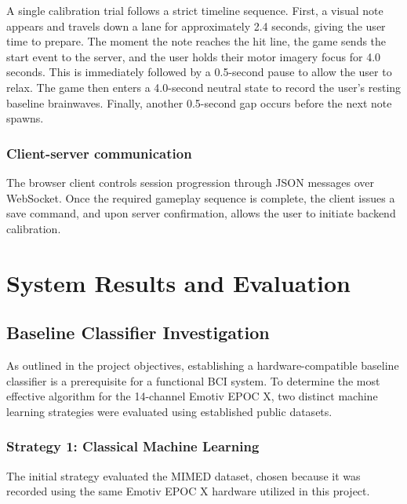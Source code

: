 \documentclass[a4paper, 11pt, openany]{report}
\begin{document}
    A single calibration trial follows a strict timeline sequence. First, a visual note appears and travels down a lane for approximately 2.4 seconds, giving the user time to prepare. The moment the note reaches the hit line, the game sends the start event to the server, and the user holds their motor imagery focus for 4.0 seconds. This is immediately followed by a 0.5-second pause to allow the user to relax. The game then enters a 4.0-second neutral state to record the user's resting baseline brainwaves. Finally, another 0.5-second gap occurs before the next note spawns.

    \subsection{Client-server communication}
    
    The browser client controls session progression through JSON messages over WebSocket. Once the required 
    gameplay sequence is complete, the client issues a save command, and upon server confirmation, allows 
    the user to initiate backend calibration.


\chapter{System Results and Evaluation}

    \section{Baseline Classifier Investigation}
    
    As outlined in the project objectives, establishing a hardware-compatible baseline classifier is a prerequisite for a functional BCI system. To determine the most effective algorithm for the 14-channel Emotiv EPOC X, two distinct machine learning strategies were evaluated using established public datasets.

    \subsection{Strategy 1: Classical Machine Learning}
    
    The initial strategy evaluated the MIMED dataset, chosen because it was recorded using the same Emotiv EPOC X hardware utilized in this project. 
    
\end{document}
